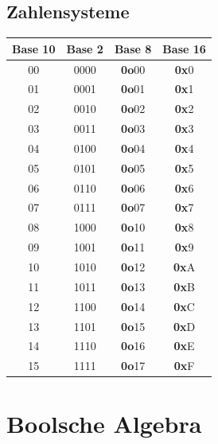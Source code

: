 \documentclass[6pt,a4paper]{scrartcl}
\renewcommand{\emph}[1]{\textsf{\textbf{#1}}}
\begin{document}
\begin{multicols*}{3}
	\subsection{Zahlensysteme}
	\begin{tabular} {c|c|c|c}
		Base 10 & Base 2 & Base 8 & Base 16 \\
		\hline
			00 & 0000 & \emph{0o}00 & \emph{0x}0 \\
			01 & 0001 & \emph{0o}01 & \emph{0x}1 \\
			02 & 0010 & \emph{0o}02 & \emph{0x}2 \\
			03 & 0011 & \emph{0o}03 & \emph{0x}3 \\
			04 & 0100 & \emph{0o}04 & \emph{0x}4 \\
			05 & 0101 & \emph{0o}05 & \emph{0x}5 \\
			06 & 0110 & \emph{0o}06 & \emph{0x}6 \\
			07 & 0111 & \emph{0o}07 & \emph{0x}7 \\
			08 & 1000 & \emph{0o}10 & \emph{0x}8 \\
			09 & 1001 & \emph{0o}11 & \emph{0x}9 \\
			10 & 1010 & \emph{0o}12 & \emph{0x}A \\
			11 & 1011 & \emph{0o}13 & \emph{0x}B \\
			12 & 1100 & \emph{0o}14 & \emph{0x}C \\
			13 & 1101 & \emph{0o}15 & \emph{0x}D \\
			14 & 1110 & \emph{0o}16 & \emph{0x}E \\
			15 & 1111 & \emph{0o}17 & \emph{0x}F
	\end{tabular}
\section{Boolsche Algebra}


\end{multicols*}
\end{document}

